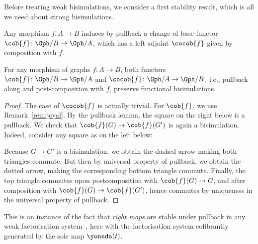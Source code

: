 \documentclass{LMCS}
\theoremstyle{plain}\newtheorem{satz}[thm]{Satz}
\begin{document}
Before treating weak bisimulations, we consider a first stability result,
which is all we need about strong bisimulations.

Any morphism $f \colon A \to B$ induces by pullback a change-of-base
functor $\cob{f} \colon \Gph / B \to \Gph / A$, which has a left
adjoint $\cocob{f}$ given by composition with $f$.

\begin{prop}\label{prop:change of base}
  For any morphism of graphs $f \colon A \to B$, both functors $\cob{f}
  \colon \Gph / B \to \Gph / A$ and $\cocob{f} \colon \Gph / A \to \Gph /
  B$, i.e., pullback along and post-composition with $f$,
  preserve functional bisimulations.
\end{prop}

\begin{proof}
  The case of $\cocob{f}$ is actually trivial.
  For $\cob{f}$, we use Remark~\ref{rem:joyal}. By the pullback lemma,
  the square on the right below
is a pullback. We check that $\cob{f} (G) \to \cob{f} (G')$ is again a
  bisimulation. Indeed, consider any square as
  on the left below:
\begin{center}
  \end{center}
  Because $G \to G'$ is a bisimulation, we obtain the dashed arrow
  making both triangles commute. But then by universal property of
  pullback, we obtain the dotted arrow, making the corresponding
  bottom triangle commute.  Finally, the top triangle commutes upon
  postcomposition with $\cob{f} (G) \to G$, and after composition with
  $\cob{f} (G) \to \cob{f} (G')$, hence commutes by uniqueness in the
  universal property of pullback.
\end{proof}
\begin{rem}
  This is an instance of the fact that \emph{right maps} are stable
  under pullback in any weak factorisation
  system~\cite{Joyal:ncatlab:facto}, here with the factorisation
  system cofibrantly generated by the sole map $\yoneda (t)$.
\end{rem}
\end{document}
